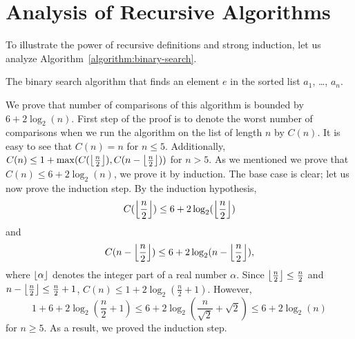 \section{Analysis of Recursive Algorithms}
To illustrate the power of recursive definitions and strong induction, let us
analyze Algorithm~\ref{algorithm:binary-search}.
\begin{algorithm}
    \begin{algorithmic}[1]
                        \State{}
                    \EndIf
                \EndFor
            \Else
                    \State{}
                \Else
                    \State{}
                \EndIf
            \EndIf
        \EndFunction
    \end{algorithmic}
    \caption{The binary search algorithm that finds an element $e$ in the sorted
        list $a_1$, \dots, $a_n$.}
    \label{algorithm:binary-search}
\end{algorithm}
We prove that number of comparisons of this algorithm is bounded by
$6 + 2\log_2(n)$. First step of the proof is to denote the worst
number of comparisons when we run the algorithm on the list of length $n$ by
$C(n)$. It is easy to see that $C(n) = n$ for $n \le 5$. Additionally,
$C(n) \le 1 + \max(C(\left\lfloor {\frac{n}{2}} \right\rfloor), C(n - \left\lfloor {\frac{n}{2}} \right\rfloor))$ for
$n > 5$. As we mentioned we prove that $C(n) \le 6 + 2\log_2(n)$, we prove it
by induction. The base case is clear; let us now prove the induction step.
By the induction hypothesis,
\[
    C(\left\lfloor {\frac{n}{2}} \right\rfloor) \le 6 + 2\log_2(\left\lfloor {\frac{n}{2}} \right\rfloor)
\]
and
\[
    C(n - \left\lfloor {\frac{n}{2}} \right\rfloor) \le 6 + 2\log_2(n - \left\lfloor {\frac{n}{2}} \right\rfloor),
\]
where $\left\lfloor {\alpha} \right\rfloor$ denotes the integer part of a real number $\alpha$.
Since $\left\lfloor {\frac{n}{2}} \right\rfloor \le \frac{n}{2}$ and $n - \left\lfloor {\frac{n}{2}} \right\rfloor \le
\frac{n}{2} + 1$, $C(n) \le 1 + 2\log_2(\frac{n}{2} + 1)$.
However,
\[
    1 + 6 + 2\log_2\left(\frac{n}{2} + 1\right) \le
    6 + 2\log_2\left(\frac{n}{\sqrt{2}} + \sqrt{2}\right) \le 6 + 2 \log_2(n)
\]
for $n \ge 5$. As a result, we proved the induction step.


